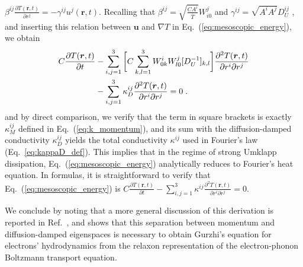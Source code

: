 \documentclass[
prb,
twocolumn,
superscriptaddress,
 amsmath,amssymb,
 aps,
longbibliography,
]{revtex4-2}
\begin{document}
$\beta^{ij} \frac{\partial T({\bm r}, t)}{\partial r^j} {=} {-} \gamma^{ij} u^j({\bm r}, t)$. Recalling that $\beta^{ij}{=}\sqrt{\frac{CA^i}{\overline T}} W_{i0}^j$ and $\gamma^{ij}{=}\sqrt{A^i A^j} D_U^{ij}$ \cite{Simoncelli2020}, and inserting this relation between $\bm{u}$ and $\nabla T$ in Eq.~(\ref{eq:mesoscopic_energy}), we obtain
\begin{equation}
\begin{split}
  C \frac{\partial T(\bm{r},t)}{\partial t}
  &- \sum_{i,j=1}^3 \bigg[C\sum_{k,l=1}^3 W_{0k}^i W_{l0}^j [D_U^{-1}]_{k,l}\bigg]\frac{\partial^2 T(\bm{r},t)}{\partial r^i\partial r^j} \\
  & - \sum_{i,j=1}^3 \kappa^{ij}_D \frac{\partial^2 T(\bm{r},t)}{\partial r^i\partial r^j} = 0 \;.
\label{eq:mesoscopic_energy_diffusive}
\end{split}
\raisetag{8mm}
\end{equation}
and by direct comparison, we verify that the term in square brackets is exactly $\kappa^{ij}_M$ defined in Eq.~(\ref{eq:k_momentum}), and its sum with the diffusion-damped conductivity $\kappa^{ij}_D$ yields the total conductivity $\kappa^{ij}$ used in Fourier's law (Eq.~\ref{eq:kappaD_def}). This implies that in the regime of strong Umklapp dissipation, Eq.~(\ref{eq:mesoscopic_energy}) analytically reduces to Fourier's heat equation. In formulas, it is straightforward to verify that Eq.~(\ref{eq:mesoscopic_energy}) is $C \frac{\partial T(\bm{r},t)}{\partial t} -  \sum_{i,j=1}^3 \kappa^{ij} \frac{\partial^2 T(\bm{r},t)}{\partial r^i\partial r^j} = 0$.


We conclude by noting that a more general discussion of this derivation is reported in Ref.~\cite{coulterCoupledElectronphononHydrodynamics2025a}, and shows that this separation between momentum and diffusion-damped eigenspaces is necessary to obtain Gurzhi's equation for electrons' hydrodynamics \cite{gurzhiHYDRODYNAMICEFFECTSSOLIDS1968,bandurin_negative_2016} from the relaxon representation of the electron-phonon Boltzmann transport equation.
\end{document}
